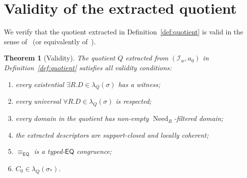 \documentclass[11pt]{article}
\newtheorem{theorem}{Theorem}[section]
\theoremstyle{definition}
\theoremstyle{remark}
\newcommand{\EQ}{\mathsf{EQ}}
\newcommand{\Need}{\operatorname{Need}}
\newcommand{\eqcong}{\equiv_{\EQ}}
\begin{document}
\section{Validity of the extracted quotient}
\label{sec:validity}

We verify that the quotient extracted in
Definition~\ref{def:quotient} is valid in the sense
of~\cite[Definition~1.10]{SplitForest} (or equivalently
of~\cite[Definition~8.2]{GPT55Generated}).

\begin{theorem}[Validity]\label{thm:validity}
The quotient $Q$ extracted from $(\mathcal{I}_w, a_0)$ in
Definition~\ref{def:quotient} satisfies all validity conditions:
\begin{enumerate}[label=(V\arabic*),leftmargin=2em]
\item every existential $\exists R.D \in \lambda_Q(\sigma)$ has a
  witness;
\item every universal $\forall R.D \in \lambda_Q(\sigma)$ is
  respected;
\item every domain in the quotient has non-empty $\Need_R$-filtered
  domain;
\item the extracted descriptors are support-closed and locally
  coherent;
\item $\eqcong$ is a typed-$\EQ$ congruence;
\item $C_0 \in \lambda_Q(\sigma_\ast)$.
\end{enumerate}
\end{theorem}
\end{document}
